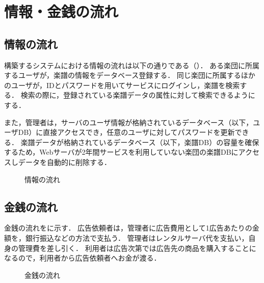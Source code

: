 \chapter{情報・金銭の流れ}
\section*{情報の流れ}\label{sec:情報の流れ}
構築するシステムにおける情報の流れは以下の通りである（）．
ある楽団に所属するユーザが，楽譜の情報をデータベース登録する．
同じ楽団に所属するほかのユーザが，IDとパスワードを用いてサービスにログインし，楽譜を検索する．
検索の際に，登録されている楽譜データの属性に対して検索できるようにする．\par
また，管理者は，サーバのユーザ情報が格納されているデータベース（以下，ユーザDB）に直接アクセスでき，任意のユーザに対してパスワードを更新できる．
楽譜データが格納されているデータベース（以下，楽譜DB）の容量を確保するため，Webサーバが2年間サービスを利用していない楽団の楽譜DBにアクセスしデータを自動的に削除する．
\begin{figure}[p]
    \centering
    
    \caption{情報の流れ}
    \label{fig:情報の流れ}
\end{figure}
\section*{金銭の流れ}\label{sec:金銭の流れ}
金銭の流れをに示す．
広告依頼者は，管理者に広告費用として1広告あたりの金額を，銀行振込などの方法で支払う．
管理者はレンタルサーバ代を支払い，自身の管理費を差し引く．
利用者は広告次第では広告先の商品を購入することになるので，利用者から広告依頼者へお金が渡る．
\begin{figure}[p]
    \centering
    
    \caption{金銭の流れ}
    \label{fig:金銭の流れ}
\end{figure}
